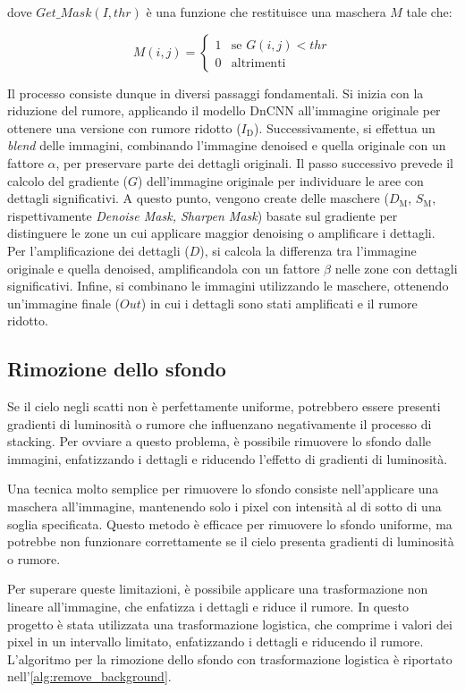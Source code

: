 dove $Get\_Mask(I, thr)$ è una funzione che restituisce una maschera $M$ tale che:

$$
M(i,j) = \begin{cases} 1 & \text{se } G(i,j) < thr \\ 0 & \text{altrimenti} \end{cases}
$$

Il processo consiste dunque in diversi passaggi fondamentali. Si inizia con la riduzione del rumore, applicando il modello DnCNN all'immagine originale per ottenere una versione con rumore ridotto ($I_{\text{D}}$).
Successivamente, si effettua un \textit{blend} delle immagini, combinando l'immagine denoised e quella originale con un fattore $\alpha$, per preservare parte dei dettagli originali.
Il passo successivo prevede il calcolo del gradiente ($G$) dell'immagine originale per individuare le aree con dettagli significativi.
A questo punto, vengono create delle maschere ($D_{\text{M}}$, $S_{\text{M}}$, rispettivamente \textit{Denoise Mask, Sharpen Mask}) basate sul gradiente per distinguere le zone un cui applicare maggior denoising o amplificare i dettagli.
Per l'amplificazione dei dettagli ($D$), si calcola la differenza tra l'immagine originale e quella denoised, amplificandola con un fattore $\beta$ nelle zone con dettagli significativi.
Infine, si combinano le immagini utilizzando le maschere, ottenendo un'immagine finale ($Out$) in cui i dettagli sono stati amplificati e il rumore ridotto.

\subsection{Rimozione dello sfondo}

Se il cielo negli scatti non è perfettamente uniforme, 
potrebbero essere presenti gradienti di luminosità o rumore che influenzano negativamente il processo di stacking. Per ovviare a questo problema, è possibile rimuovere lo sfondo dalle immagini, enfatizzando i dettagli e riducendo l'effetto di gradienti di luminosità.

Una tecnica molto semplice per rimuovere lo sfondo consiste nell'applicare una maschera all'immagine, mantenendo solo i pixel con intensità al di sotto di una soglia specificata. Questo metodo è efficace per rimuovere lo sfondo uniforme, ma potrebbe non funzionare correttamente se il cielo presenta gradienti di luminosità o rumore.

Per superare queste limitazioni, è possibile applicare una trasformazione non lineare all'immagine, che enfatizza i dettagli e riduce il rumore. In questo progetto è stata utilizzata una trasformazione logistica, che comprime i valori dei pixel in un intervallo limitato, enfatizzando i dettagli e riducendo il rumore. L'algoritmo per la rimozione dello sfondo con trasformazione logistica è riportato nell'\cref{alg:remove_background}.

